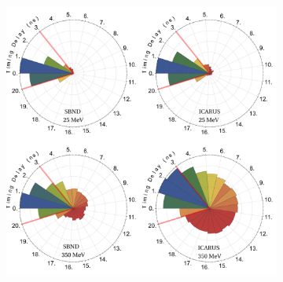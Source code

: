 \documentclass[11pt, a4paper]{article}
\begin{document}
\begin{figure}[t]
\center
\begin{subfigure}[c]{0.68\textwidth}
\includegraphics[width=\textwidth]{figures/timing.pdf} 
\end{subfigure}%
~
\begin{subfigure}[c]{0.32\textwidth}

\end{subfigure}
\end{figure}
\end{document}
